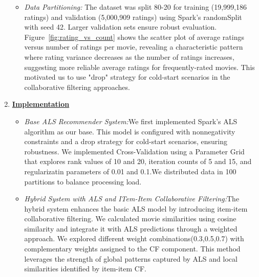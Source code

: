 \documentclass[9pt]{article}
\begin{document}
\begin{enumerate}
\begin{itemize}
      \item \textit{Data Partitioning:} The dataset was split 80-20 for training (19,999,186 ratings) and validation (5,000,909 ratings) using Spark's randomSplit with seed 42. Larger validation sets ensure robust evaluation. Figure~\ref{fig:rating_vs_count} shows the scatter plot of average ratings versus number of ratings per movie, revealing a characteristic pattern where rating variance decreases as the number of ratings increases, suggesting more reliable average ratings for frequently-rated movies. This motivated us to use "drop" strategy for cold-start scenarios in the collaborative filtering approaches.
    \end{itemize}
    \begin{figure}[H]
    \end{figure}
    \begin{figure}[H]
    \end{figure}
    \item \textbf{\underline{Implementation}}
    \begin{itemize}
      \item \textit{Base ALS Recommender System:}We first implemented Spark's ALS algorithm as our base. This model is configured with nonnegativity constraints and a drop strategy for cold-start scenarios, ensuring robustness. We implemented Cross-Validation using a Parameter Grid that explores rank values of 10 and 20, iteration counts of 5 and 15, and regularizatin parameters of 0.01 and 0.1.We distributed data in 100 partitions to balance processing load.
      \item \textit{Hybrid System with ALS and ITem-Item Collaborative Filtering:}The hybrid system enhances the basic ALS model by introducing item-item collaborative filtering. We calculated movie similarities using cosine similarity and integrate it with ALS predictions through a weighted approach. We explored different weight combinations(0.3,0.5,0.7) with complementary weights assigned to the CF component. This method leverages the strength of global patterns captured by ALS and local similarities identified by item-item CF.

\end{itemize}
\end{enumerate}
\end{document}
